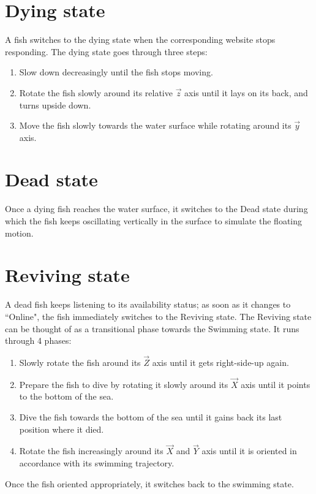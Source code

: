 \section{Dying state}
A fish switches to the dying state when the corresponding website stops responding. The dying state goes through three steps:
\begin{enumerate}
\item Slow down decreasingly until the fish stops moving.
\item Rotate the fish slowly around its relative $\overrightarrow{z}$ axis until it lays on its back, and turns upside down.
\item Move the fish slowly towards the water surface while rotating around its $\overrightarrow{y}$ axis.
\end{enumerate}

\section{Dead state}
Once a dying fish reaches the water surface, it switches to the Dead state during which the fish keeps oscillating vertically in the surface to simulate the floating motion.

\section{Reviving state}
A dead fish keeps listening to its availability status; as soon as it changes to ``Online", the fish immediately switches to  the Reviving state. The Reviving state can be thought of as a transitional phase towards the Swimming state. It runs through 4 phases:
\begin{enumerate}
\item Slowly rotate the fish around its $\overrightarrow{Z}$ axis until it gets right-side-up again.
\item Prepare the fish to dive by rotating it slowly around its $\overrightarrow{X}$ axis until it points to the bottom of the sea.
\item Dive the fish towards the bottom of the sea until it gains back its last position where it died.
\item Rotate the fish increasingly around its $\overrightarrow{X}$ and $\overrightarrow{Y}$ axis until it is oriented in accordance with its swimming trajectory.
\end{enumerate}
Once the fish oriented appropriately, it switches back to the swimming state.

